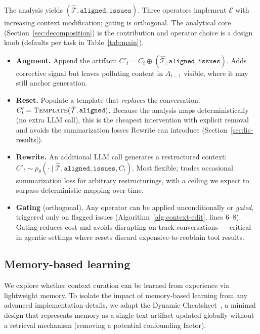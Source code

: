 \documentclass{article}
\begin{document}
The analysis yields $(\hat{\mathcal{T}}, \texttt{aligned}, \texttt{issues})$. Three operators implement $\mathcal{E}$ with increasing context modification; gating is orthogonal. The analytical core (Section~\ref{sec:decomposition}) is the contribution and operator choice is a design knob (defaults per task in Table~\ref{tab:main}).
\begin{itemize}[leftmargin=*, topsep=2pt, itemsep=1pt, parsep=0pt]
    \item \textbf{Augment.} Append the artifact: $C'_t = C_t \oplus (\hat{\mathcal{T}}, \texttt{aligned}, \texttt{issues})$. Adds corrective signal but leaves polluting content in $A_{t-1}$ visible, where it may still anchor generation.
    \item \textbf{Reset.} Populate a template that \emph{replaces} the conversation: $C'_t = \textsc{Template}(\hat{\mathcal{T}}, \texttt{aligned})$. Because the analysis maps deterministically (no extra LLM call), this is the cheapest intervention with explicit removal and avoids the summarization losses Rewrite can introduce (Section~\ref{sec:lic-results}).
    \item \textbf{Rewrite.} An additional LLM call generates a restructured context: $C'_t \sim p_\theta(\cdot \mid \hat{\mathcal{T}}, \texttt{aligned}, \texttt{issues}, C_t)$. Most flexible; trades occasional summarization loss for arbitrary restructurings, with a ceiling we expect to surpass deterministic mapping over time.
    \item \textbf{Gating} (orthogonal). Any operator can be applied unconditionally or \emph{gated}, triggered only on flagged issues (Algorithm~\ref{alg:context-edit}, lines 6--8). Gating reduces cost and avoids disrupting on-track conversations --- critical in agentic settings where resets discard expensive-to-reobtain tool results.
\end{itemize}

\subsection{Memory-based learning}
\label{sec:memory}

We explore whether context curation can be learned from experience via lightweight memory. 
To isolate the impact of memory-based learning from any advanced implementation details, we adapt the Dynamic Cheatsheet~\citep{suzgun2025cheatsheet}, a minimal design that represents memory as a single text artifact updated globally without a retrieval mechanism (removing a potential confounding factor).
\end{document}
